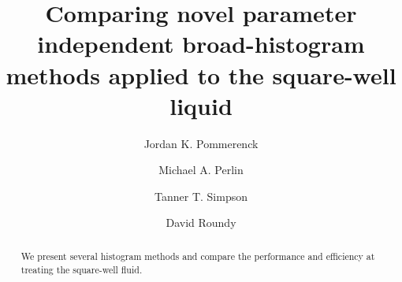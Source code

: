 \documentclass[letterpaper,twocolumn,amsmath,amssymb,pre,aps,10pt]{revtex4-1}
\begin{document}
\title{Comparing novel parameter independent broad-histogram methods
applied to the square-well liquid}

\author{Jordan K. Pommerenck} \author{Michael A. Perlin}
\author{Tanner T. Simpson} \author{David Roundy}

\begin{abstract}
  We present several histogram methods and compare the performance and efficiency at treating the square-well fluid.
\end{abstract}

\maketitle





\end{document}

